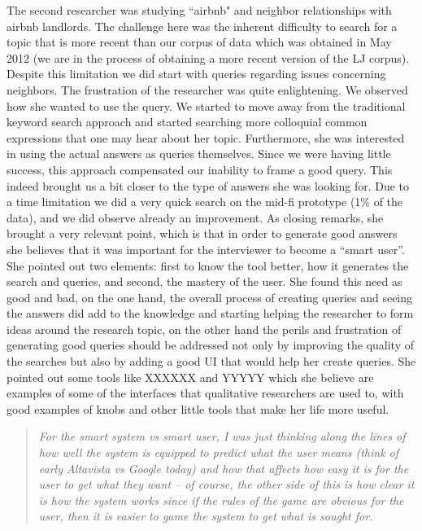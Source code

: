 \documentclass{sigchi}
\begin{document}
The second researcher was studying ``airbnb" and neighbor relationships with airbnb landlords. The challenge here was the inherent difficulty to search for a topic that is more recent than our corpus of data which was obtained in May 2012 (we are in the process of obtaining a more recent version of the LJ corpus). Despite this limitation we did start with queries regarding issues concerning neighbors. The frustration of the researcher was quite enlightening. We observed how she wanted to use the query. We started to move away from the traditional keyword search approach and started searching more colloquial common expressions that one may hear about her topic. Furthermore, she was interested in using the actual answers as queries themselves. Since we were having little success, this approach compensated our inability to frame a good query. This indeed brought us a bit closer to the type of answers she was looking for. Due to a time limitation we did a very quick search on the mid-fi prototype (1\% of the data), and we did observe already an improvement. As closing remarks, she brought a very relevant point, which is that in order to generate good answers she believes that it was important for the interviewer to become a ``smart user''. She pointed out two elements: first to know the tool better, how it generates the search and queries, and second, the mastery of the user. She found this need as good and bad, on the one hand, the overall process of creating queries and seeing the answers did add to the knowledge and starting helping the researcher to form ideas around the research topic, on the other hand the perils and frustration of generating good queries should be addressed not only by improving the quality of the searches but also by adding a good UI that would help her create queries. She pointed out some tools like XXXXXX and YYYYY which she believe are examples of some of the interfaces that qualitative researchers are used to, with good examples of knobs and other little tools that make her life more useful. 

\begin{quote}
{\em
For the smart system vs smart user, I was just thinking along the lines of how well the system is equipped to predict what the user means (think of early Altavista vs Google today) and how that affects how easy it is for the user to get what they want -- of course, the other side of this is how clear it is how the system works since if the rules of the game are obvious for the user, then it is easier to game the system to get what is sought for.
}\end{quote}
\end{document}
